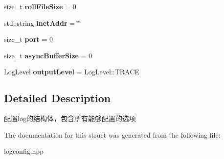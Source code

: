 \begin{DoxyCompactItemize}
\mbox{\label{structdaq_1_1LogConfigStruct_a9f116d5a796d9c9c8a00239665d3cfd3}} 
size\+\_\+t {\bfseries roll\+File\+Size} = 0
\item 
\mbox{\label{structdaq_1_1LogConfigStruct_afd109c9963afa4478cf61fc2afa6070f}} 
std\+::string {\bfseries inet\+Addr} = \char`\"{}\char`\"{}
\item 
\mbox{\label{structdaq_1_1LogConfigStruct_ad0e58c4bebd8efe24ab544b11e1a4c7e}} 
size\+\_\+t {\bfseries port} = 0
\item 
\mbox{\label{structdaq_1_1LogConfigStruct_a0c734005018b752abf706988ba5c4273}} 
size\+\_\+t {\bfseries async\+Buffer\+Size} = 0
\item 
\mbox{\label{structdaq_1_1LogConfigStruct_a66e55a9a3929bfe9a66804d47ee52267}} 
Log\+Level {\bfseries output\+Level} = Log\+Level\+::\+T\+R\+A\+CE
\end{DoxyCompactItemize}


\subsection{Detailed Description}
配置log的结构体，包含所有能够配置的选项 

The documentation for this struct was generated from the following file\+:\begin{DoxyCompactItemize}
\item 
logconfig.\+hpp\end{DoxyCompactItemize}
